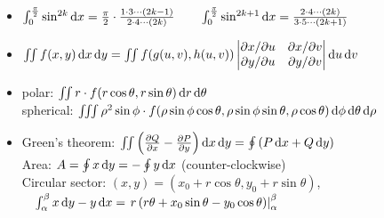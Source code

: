\begin{itemize}
    \item
    $
        \int_{0}^{\frac{\pi}{2}} \sin^{2k} \mathop{}\!\mathrm{d} x = \frac{\pi}{2} \cdot \frac{1 \cdot 3 \cdots (2k - 1)}{2 \cdot 4 \cdots (2k)}
        \quad\quad
        \int_{0}^{\frac{\pi}{2}} \sin^{2k + 1} \mathop{}\!\mathrm{d} x = \frac{2 \cdot 4 \cdots (2k)}{3 \cdot 5 \cdots (2k + 1)}
    $

    \item
    $
        \iint f(x, y) \mathop{}\!\mathrm{d} x \mathop{}\!\mathrm{d} y
        = \iint f(g(u, v), h(u, v)) \begin{vmatrix}
            \partial x / \partial u & \partial x / \partial v \\
            \partial y / \partial u & \partial y / \partial v \\
        \end{vmatrix} \mathop{}\!\mathrm{d} u \mathop{}\!\mathrm{d} v
    $

    \item
    polar: $
        \iint r \cdot f(r \cos \theta, r \sin \theta) \mathop{}\!\mathrm{d} r \mathop{}\!\mathrm{d} \theta
    $ \\
    spherical: $
        \iiint \rho^2 \sin \phi \cdot f(\rho \sin \phi \cos \theta, \rho \sin \phi \sin \theta, \rho \cos \theta) \mathop{}\!\mathrm{d} \phi \mathop{}\!\mathrm{d} \theta \mathop{}\!\mathrm{d} \rho
    $

    \item
    Green's theorem: $ \iint \left( \frac{\partial Q}{\partial x} - \frac{\partial P}{\partial y} \right) \mathop{}\!\mathrm{d} x \mathop{}\!\mathrm{d} y = \oint \left( P \mathop{}\!\mathrm{d} x + Q \mathop{}\!\mathrm{d} y \right) $ \\
    Area: $A = \oint x \mathop{}\!\mathrm{d} y = -\oint y \mathop{}\!\mathrm{d} x$ (counter-clockwise) \\
    Circular sector: $(x, y) = (x_0 + r \cos \theta, y_0 + r \sin \theta)$, \\ $\quad \int_{\alpha}^{\beta} x \mathop{}\!\mathrm{d} y - y \mathop{}\!\mathrm{d} x = \left. r \left( r \theta + x_0 \sin \theta - y_0 \cos \theta \right) \right|_{\alpha}^{\beta}$
\end{itemize}
